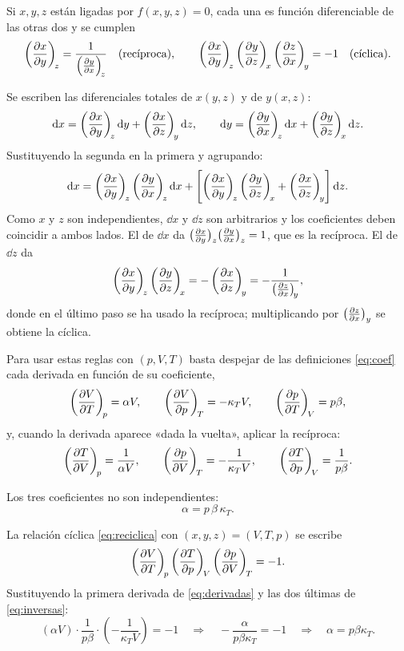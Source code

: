 \begin{proposicion}
Si $x,y,z$ están ligadas por $f(x,y,z)=0$, cada una es función diferenciable de las otras dos y se
cumplen
\begin{equation}\label{eq:reciclica}
  \pd{x}{y}{z}=\frac{1}{\pd{y}{x}{z}}\quad\text{(recíproca)},\qquad
  \pd{x}{y}{z}\pd{y}{z}{x}\pd{z}{x}{y}=-1\quad\text{(cíclica)}.
\end{equation}
\end{proposicion}

\begin{demostracion}
Se escriben las diferenciales totales de $x(y,z)$ y de $y(x,z)$:
\[
  \dd x=\pd{x}{y}{z}\dd y+\pd{x}{z}{y}\dd z,\qquad
  \dd y=\pd{y}{x}{z}\dd x+\pd{y}{z}{x}\dd z.
\]
Sustituyendo la segunda en la primera y agrupando:
\[
  \dd x=\pd{x}{y}{z}\pd{y}{x}{z}\dd x+\left[\pd{x}{y}{z}\pd{y}{z}{x}+\pd{x}{z}{y}\right]\dd z.
\]
Como $x$ y $z$ son independientes, $\dd x$ y $\dd z$ son arbitrarios y los coeficientes deben
coincidir a ambos lados. El de $\dd x$ da $\pdi{x}{y}{z}\pdi{y}{x}{z}=1$, que es la recíproca. El de
$\dd z$ da
\[
  \pd{x}{y}{z}\pd{y}{z}{x}=-\pd{x}{z}{y}=-\frac{1}{\pd{z}{x}{y}},
\]
donde en el último paso se ha usado la recíproca; multiplicando por $\pdi{z}{x}{y}$ se obtiene la cíclica.
\end{demostracion}

Para usar estas reglas con $(p,V,T)$ basta despejar de las definiciones \eqref{eq:coef} cada derivada
en función de su coeficiente,
\begin{equation}\label{eq:derivadas}
  \pd{V}{T}{p}=\alpha V,\qquad \pd{V}{p}{T}=-\kappa_TV,\qquad \pd{p}{T}{V}=p\beta,
\end{equation}
y, cuando la derivada aparece «dada la vuelta», aplicar la recíproca:
\begin{equation}\label{eq:inversas}
  \pd{T}{V}{p}=\frac{1}{\alpha V},\qquad \pd{p}{V}{T}=-\frac{1}{\kappa_TV},\qquad \pd{T}{p}{V}=\frac{1}{p\beta}.
\end{equation}

\begin{proposicion}
Los tres coeficientes no son independientes:
\begin{equation}\label{eq:apbk}
  \alpha=p\,\beta\,\kappa_T.
\end{equation}
\end{proposicion}

\begin{demostracion}
La relación cíclica \eqref{eq:reciclica} con $(x,y,z)=(V,T,p)$ se escribe
\[
  \pd{V}{T}{p}\pd{T}{p}{V}\pd{p}{V}{T}=-1.
\]
Sustituyendo la primera derivada de \eqref{eq:derivadas} y las dos últimas de \eqref{eq:inversas}:
\[
  (\alpha V)\cdot\frac{1}{p\beta}\cdot\left(-\frac{1}{\kappa_TV}\right)=-1
  \quad\Longrightarrow\quad -\frac{\alpha}{p\beta\kappa_T}=-1
  \quad\Longrightarrow\quad \alpha=p\beta\kappa_T.
\]
\end{demostracion}


